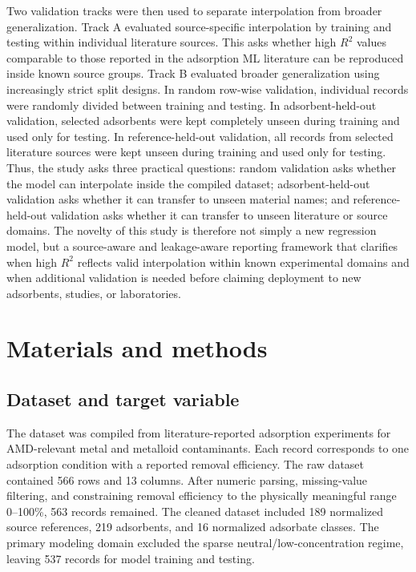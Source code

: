\documentclass[review,12pt,number]{elsarticle}
\begin{document}
Two validation tracks were then used to separate interpolation from broader generalization. Track A evaluated source-specific interpolation by training and testing within individual literature sources. This asks whether high $R^2$ values comparable to those reported in the adsorption ML literature can be reproduced inside known source groups. Track B evaluated broader generalization using increasingly strict split designs. In random row-wise validation, individual records were randomly divided between training and testing. In adsorbent-held-out validation, selected adsorbents were kept completely unseen during training and used only for testing. In reference-held-out validation, all records from selected literature sources were kept unseen during training and used only for testing. Thus, the study asks three practical questions: random validation asks whether the model can interpolate inside the compiled dataset; adsorbent-held-out validation asks whether it can transfer to unseen material names; and reference-held-out validation asks whether it can transfer to unseen literature or source domains. The novelty of this study is therefore not simply a new regression model, but a source-aware and leakage-aware reporting framework that clarifies when high $R^2$ reflects valid interpolation within known experimental domains and when additional validation is needed before claiming deployment to new adsorbents, studies, or laboratories.

\section{Materials and methods}

\subsection{Dataset and target variable}

The dataset was compiled from literature-reported adsorption experiments for AMD-relevant metal and metalloid contaminants. Each record corresponds to one adsorption condition with a reported removal efficiency. The raw dataset contained 566 rows and 13 columns. After numeric parsing, missing-value filtering, and constraining removal efficiency to the physically meaningful range 0--100\%, 563 records remained. The cleaned dataset included 189 normalized source references, 219 adsorbents, and 16 normalized adsorbate classes. The primary modeling domain excluded the sparse neutral/low-concentration regime, leaving 537 records for model training and testing.
\end{document}
